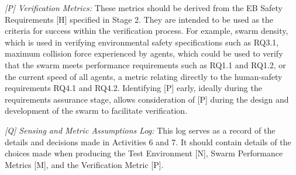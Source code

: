 \documentclass[runningheads]{llncs}
\begin{document}
\emph{[P] Verification Metrics:} These metrics should be derived from the EB Safety Requirements [H] specified in Stage 2. 
They are intended to be used as the criteria for success within the verification process. 
For example, swarm density, which is used in verifying environmental safety specifications such as RQ3.1, maximum collision force experienced by agents, which could be used to verify that the swarm meets performance requirements such as RQ1.1 and RQ1.2, or the current speed of all agents, a metric relating directly to the human-safety requirements RQ4.1 and RQ4.2. 
Identifying [P] early, ideally during the requirements assurance stage, allows consideration of [P] during the design and development of the swarm to facilitate verification.  
%
%
%

\emph{[Q] Sensing and Metric Assumptions Log:} This log serves as a record of the details and decisions made in Activities 6 and 7. It should contain details of the choices made when producing the Test Environment [N], Swarm Performance Metrics [M], and the Verification Metric [P].
\end{document}

